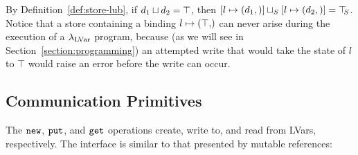 \DefLeqStore

\DefLubStore

\noindent By Definition~\ref{def:store-lub}, if $d_1 \sqcup d_2 =
\top$, then
$\left[ l \mapsto (d_1, \right)] \sqcup_{S} \left[ l \mapsto (d_2, \right)]
= \top\hspace{-0.85mm}_{S}$.  
Notice that a store containing a binding $\storebinding{l}{\top}$ can never arise
during the execution of a $\lambda_{\textrm{LVar}}$ program, because (as we will
see in Section~\ref{section:programming}) an attempted write that would take
the state of $l$ to $\top$ would raise an error before the write can occur.

\subsection{Communication Primitives}\label{subsection:putget}



The $\mbox{\texttt{new}}$, $\mbox{\texttt{put}}$, and $\mbox{\texttt{get}}$ operations create, write to, and read
from LVars, respectively.  The interface is similar to that presented
by mutable references:

